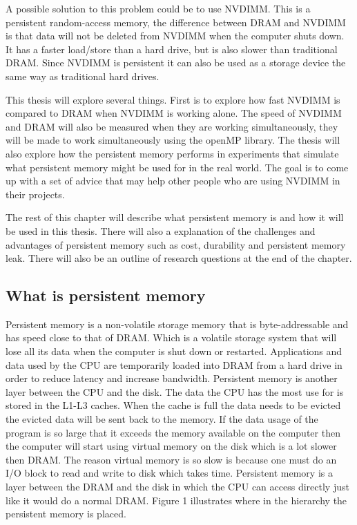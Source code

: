 \documentclass[12pt,a4paper,USenglish]{article}      %
\begin{document}
A possible solution to this problem could be to use NVDIMM. This is a persistent random-access memory\cite{whatIsPMEM}\cite{whatIsPMEM2}, the difference between DRAM and NVDIMM is that data will not be deleted from NVDIMM when the computer shuts down. 
It has a faster load/store than a hard drive, but is also slower than traditional DRAM. Since NVDIMM is persistent it can also be used as a storage device the same way as traditional hard drives.

This thesis will explore several things. First is to explore how fast NVDIMM is compared to DRAM when NVDIMM is working alone. The speed of NVDIMM and DRAM will also be measured when they are working simultaneously, they will be made to work simultaneously using the openMP library.
The thesis will also explore how the persistent memory performs in experiments that simulate what persistent memory might be used for in the real world. The goal is to come up with a set of advice that may help other people who are using NVDIMM in their projects.

The rest of this chapter will describe what persistent memory is and how it will be used in this thesis. There will also a explanation of the challenges and advantages of persistent memory such as cost, durability and persistent memory leak. There will also be an outline of research questions at the end of the chapter. 

\subsection{What is persistent memory}
Persistent memory\cite{Rudoff2} is a non-volatile storage memory\cite{Mahmut} that is byte-addressable and has speed close to that of DRAM. Which is a volatile storage system that will lose all its data when the computer is shut down or restarted. Applications and data used by the CPU are temporarily loaded into DRAM from a hard drive in order to reduce latency and increase bandwidth. Persistent memory is another layer between the CPU and the disk. The data the CPU has the most use for is stored in the L1-L3 caches. When the cache is full the data needs to be evicted the evicted data will be sent back to the memory. If the data usage of the program is so large that it exceeds the memory available on the computer then the computer will start using virtual memory on the disk which is a lot slower then DRAM. The reason virtual memory is so slow is because one must do an I/O block to read and write to disk which takes time. Persistent memory is a layer between the DRAM and the disk in which the CPU can access directly just like it would do a normal DRAM. Figure 1 illustrates where in the hierarchy the persistent memory is placed.
\end{document}
